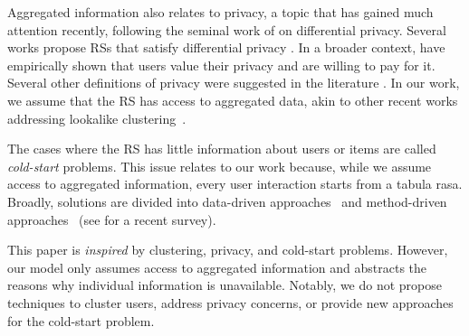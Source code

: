 Aggregated information also relates to privacy, a topic that has gained much attention recently, following the seminal work of \citet{differential-privacy} on differential privacy. Several works propose RSs that satisfy differential privacy \cite{differentially-private-recommender-systems-building-privacy-into-the-netflix-prize-contenders, differentially-private-collaborative-coupling-learning-for-recommender-systems, differential-privacy-for-collaborative-filtering-recommender-algorithm}. In a broader context, \citet{the-effect-of-online-privacy-information-on-purchasing-behavior-an-experimental-study} have empirically shown that users value their privacy and are willing to pay for it. Several other definitions of privacy were suggested in the literature \cite{an-agent-based-approach-for-privacy-preserving-recommender-systems,
enhancing-privacy-and-preserving-accuracy-of-a-distributed-collaborative-filtering,svd-based-collaborative-filtering-with-privacy}. In our work, we assume that the RS has access to aggregated data, akin to other recent works addressing lookalike clustering~\cite{anonymous-learning-via-look-alike-clustering-a-precise-analysis-of-model-generalization, interactive-and-explainable-point-of-interest-recommendation-using-look-alike-groups}.

The cases where the RS has little information about users or items are called \emph{cold-start} problems. This issue relates to our work because, while we assume access to aggregated information, every user interaction starts from a tabula rasa. Broadly, solutions are divided into data-driven approaches~\cite{a-heterogeneous-information-network-based-cross-domain-insurance-recommendation-system-for-cold-start-users, transfer-meta-framework-for-cross-domain-recommendation-to-cold-start-users, alleviating-data-sparsity-and-cold-start-in-recommender-systems-using-social-behaviour} and method-driven approaches~\cite{personalized-adaptive-meta-learning-for-cold-start-user-preference-prediction, task-adaptive-neural-process-for-user-cold-start-recommendation, meta-matrix-factorization-for-federated-rating-predictions} (see \citet{user-cold-start-problem-in-recommendation-systems-a-systematic-review} for a recent survey). 

This paper is \emph{inspired} by clustering, privacy, and cold-start problems. However, our model only assumes access to aggregated information and abstracts the reasons why individual information is unavailable. Notably, we do not propose techniques to cluster users, address privacy concerns, or provide new approaches for the cold-start problem.

